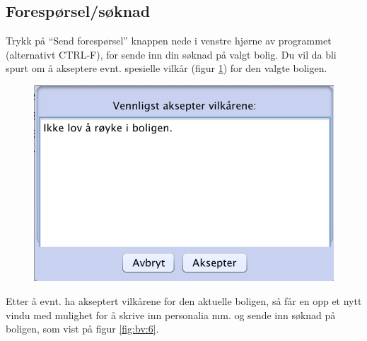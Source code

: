 \subsection{Forespørsel/søknad}
Trykk på “Send forespørsel” knappen nede i venstre hjørne av programmet (alternativt CTRL-F),
for sende inn din søknad på valgt bolig. Du vil da bli spurt om å akseptere evnt. spesielle vilkår
(figur \ref{fig:bv:5}) for den valgte boligen.

\begin{figure}[h!]
\center
 \includegraphics[scale=0.7]{./img/brukerveiledning/5.png}
 \caption{}
 \label{fig:bv:5}
\end{figure}


Etter å evnt. ha akseptert vilkårene for den aktuelle boligen, så får en opp et nytt vindu med
mulighet for å skrive inn personalia mm. og sende inn søknad på boligen, som vist på figur \ref{fig:bv:6}.



